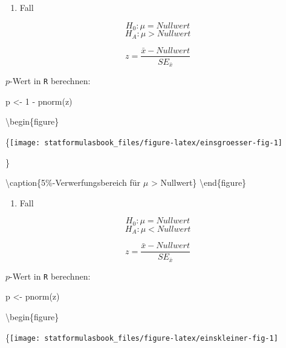 \documentclass[
]{book}
\newenvironment{Shaded}{\begin{snugshade}}{\end{snugshade}}
\newcommand{\DecValTok}[1]{\textcolor[rgb]{0.00,0.00,0.81}{#1}}
\newcommand{\FunctionTok}[1]{\textcolor[rgb]{0.00,0.00,0.00}{#1}}
\newcommand{\NormalTok}[1]{#1}
\newcommand{\OtherTok}[1]{\textcolor[rgb]{0.56,0.35,0.01}{#1}}
\newcommand{\SpecialCharTok}[1]{\textcolor[rgb]{0.00,0.00,0.00}{#1}}
\providecommand{\tightlist}{%
  \setlength{\itemsep}{0pt}\setlength{\parskip}{0pt}}
\begin{document}
\begin{enumerate}
\def\labelenumi{\arabic{enumi}.}
\tightlist
\item
  Fall
\end{enumerate}

\[H_0: \mu = Nullwert\]
\[H_A: \mu > Nullwert\]

\begin{equation}
  z = \frac{\bar{x}-Nullwert}{SE_{\bar{x}}}
  \label{eq:zonesidedgreater}
\end{equation}

\(p\)-Wert in \texttt{R} berechnen:

\begin{Shaded}
\begin{Highlighting}[]
\NormalTok{p }\OtherTok{\textless{}{-}} \DecValTok{1} \SpecialCharTok{{-}} \FunctionTok{pnorm}\NormalTok{(z)}
\end{Highlighting}
\end{Shaded}

\textbackslash begin\{figure\}

\{\centering \texttt{[image: statformulasbook\_files/figure-latex/einsgroesser-fig-1]}

\}

\textbackslash caption\{5\%-Verwerfungsbereich für \(\mu\) \textgreater{} Nullwert\}\label{fig:einsgroesser-fig}
\textbackslash end\{figure\}

\begin{enumerate}
\def\labelenumi{\arabic{enumi}.}
\setcounter{enumi}{1}
\tightlist
\item
  Fall
\end{enumerate}

\[H_0: \mu = Nullwert\]
\[H_A: \mu < Nullwert\]

\begin{equation}
  z = \frac{\bar{x}-Nullwert}{SE_{\bar{x}}}
  \label{eq:zonesidedless}
\end{equation}

\(p\)-Wert in \texttt{R} berechnen:

\begin{Shaded}
\begin{Highlighting}[]
\NormalTok{p }\OtherTok{\textless{}{-}} \FunctionTok{pnorm}\NormalTok{(z)}
\end{Highlighting}
\end{Shaded}

\textbackslash begin\{figure\}

\{\centering \texttt{[image: statformulasbook\_files/figure-latex/einskleiner-fig-1]}
\end{document}
